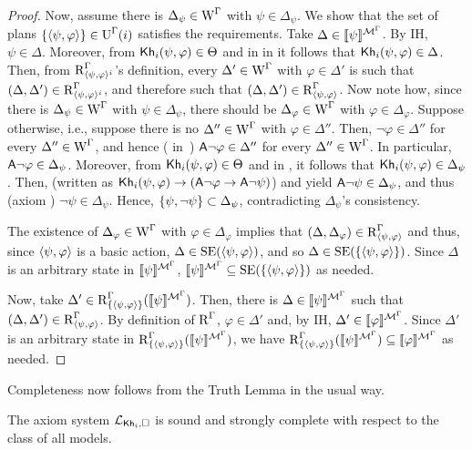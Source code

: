 \begin{proof}
Now, assume there is $\Delta_\psi \in \operatorname{W}^\Gamma$ with $\psi \in \Delta_\psi$. We show that the set of plans $\{ \langle \psi, \varphi \rangle \} \in \operatorname{U}^\Gamma(i)$ satisfies the requirements.
Take $\Delta \in \llbracket \psi \rrbracket^{\mathcal{M}^\Gamma}$. By IH, $\psi \in \Delta$.
Moreover, from ${\sf Kh}_i(\psi, \varphi) \in \Theta$ and  in  in  it follows that ${\sf Kh}_i(\psi, \varphi) \in \Delta$.
Then, from $\operatorname{R}^\Gamma_{\langle \psi,\varphi \rangle^i}$'s definition, every $\Delta' \in \operatorname{W}^\Gamma$ with $\varphi \in \Delta'$ is such that $(\Delta, \Delta') \in \operatorname{R}^\Gamma_{\langle \psi,\varphi \rangle^i}$, and therefore such that $(\Delta, \Delta') \in \operatorname{R}^\Gamma_{\langle \psi,\varphi \rangle}$.
Now note how, since there is $\Delta_\psi \in \operatorname{W}^\Gamma$ with $\psi \in \Delta_\psi$, there should be $\Delta_\varphi \in \operatorname{W}^\Gamma$ with $\varphi \in \Delta_\varphi$.
Suppose otherwise, i.e., suppose there is no $\Delta'' \in \operatorname{W}^\Gamma$ with $\varphi \in \Delta''$. Then, $\lnot \varphi \in \Delta''$ for every $\Delta'' \in \operatorname{W}^\Gamma$, and hence ( in~) ${\sf A}\lnot\varphi \in \Delta''$ for every $\Delta'' \in \operatorname{W}^\Gamma$.
In particular, ${\sf A}\lnot\varphi \in \Delta_\psi$. Moreover, from ${\sf Kh}_i(\psi, \varphi) \in \Theta$ and  in , it follows that ${\sf Kh}_i(\psi, \varphi) \in \Delta_\psi$. Then,  (written as ${\sf Kh}_i(\psi, \varphi) \rightarrow ({\sf A}\lnot \varphi \rightarrow {\sf A} \lnot \psi)$) and  yield ${\sf A}\lnot\psi \in \Delta_\psi$, and thus (axiom ) $\lnot\psi \in \Delta_\psi$.
Hence, $\{ \psi, \lnot\psi \} \subset \Delta_\psi$, contradicting $\Delta_\psi$'s consistency.

The existence of $\Delta_\varphi \in \operatorname{W}^\Gamma$ with $\varphi \in \Delta_\varphi$ implies that $(\Delta, \Delta_\varphi) \in \operatorname{R}^\Gamma_{\langle \psi,\varphi \rangle}$ and thus, since $\langle \psi,\varphi \rangle$ is a basic action, $\Delta \in \operatorname{SE}(\langle \psi,\varphi \rangle)$, and so $\Delta \in \operatorname{SE}(\{ \langle \psi,\varphi \rangle \})$. Since $\Delta$ is an arbitrary state in $\llbracket \psi \rrbracket^{\mathcal{M}^\Gamma}$, $\llbracket \psi \rrbracket^{\mathcal{M}^\Gamma} \subseteq \operatorname{SE}(\{ \langle \psi,\varphi \rangle \})$ as needed.

Now, take $\Delta' \in \operatorname{R}^\Gamma_{\{ \langle \psi,\varphi \rangle \}}(\llbracket \psi \rrbracket^{\mathcal{M}^\Gamma})$. Then, there is $\Delta \in \llbracket \psi \rrbracket^{\mathcal{M}^\Gamma}$ such that $(\Delta, \Delta') \in \operatorname{R}^\Gamma_{\langle \psi,\varphi \rangle}$. By definition of $\operatorname{R}^\Gamma$, $\varphi \in \Delta'$ and, by IH, $\Delta' \in \llbracket \varphi \rrbracket^{\mathcal{M}^\Gamma}$. Since $\Delta'$ is an arbitrary state in $\operatorname{R}^\Gamma_{\{ \langle \psi,\varphi \rangle \}}(\llbracket \psi \rrbracket^{\mathcal{M}^\Gamma})$, we have $\operatorname{R}^\Gamma_{\{ \langle \psi,\varphi \rangle \}}(\llbracket \psi \rrbracket^{\mathcal{M}^\Gamma}) \subseteq \llbracket \varphi \rrbracket^{\mathcal{M}^\Gamma}$ as needed.
\end{proof}

Completeness now follows from the Truth Lemma in the usual way. 

\medskip

\begin{theorem}\label{th:cm-ults-khikt-completeness}
The axiom system $\mathcal{L}_{{\sf Kh}_i,\square}$ is sound and strongly complete with respect to the class of all models.
\end{theorem}
\medskip
